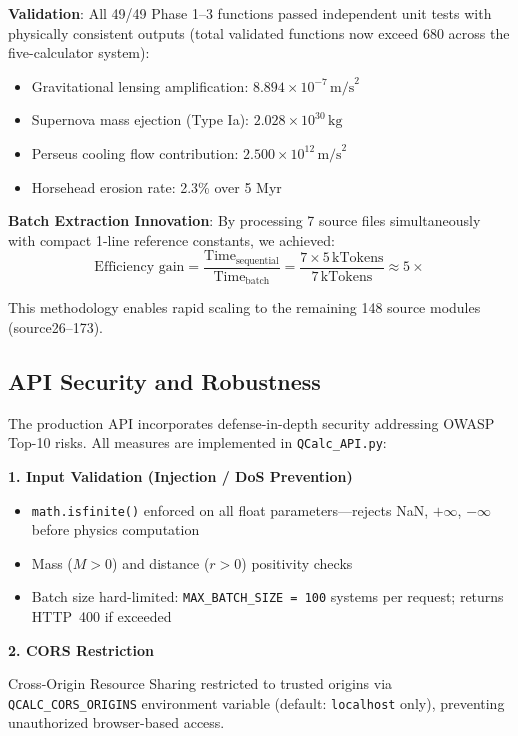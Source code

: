 \documentclass[12pt,a4paper]{article}
\begin{document}
\textbf{Validation}: All 49/49 Phase 1--3 functions passed independent unit tests with physically consistent outputs (total validated functions now exceed 680 across the five-calculator system):
\begin{itemize}
    \item Gravitational lensing amplification: $8.894 \times 10^{-7}\,\text{m/s}^2$
    \item Supernova mass ejection (Type Ia): $2.028 \times 10^{30}\,\text{kg}$
    \item Perseus cooling flow contribution: $2.500 \times 10^{12}\,\text{m/s}^2$
    \item Horsehead erosion rate: 2.3\% over 5 Myr
\end{itemize}

\textbf{Batch Extraction Innovation}: By processing 7 source files simultaneously with compact 1-line reference constants, we achieved:
\begin{equation}
\text{Efficiency gain} = \frac{\text{Time}_{\text{sequential}}}{\text{Time}_{\text{batch}}} = \frac{7 \times 5\,\text{kTokens}}{7\,\text{kTokens}} \approx 5\times
\end{equation}

This methodology enables rapid scaling to the remaining 148 source modules (source26--173).

\subsection{API Security and Robustness}

The production API incorporates defense-in-depth security addressing OWASP Top-10 risks. All measures are implemented in \texttt{QCalc\_API.py}:

\textbf{1. Input Validation (Injection / DoS Prevention)}
\begin{itemize}
    \item \texttt{math.isfinite()} enforced on all float parameters---rejects NaN, $+\infty$, $-\infty$ before physics computation
    \item Mass ($M > 0$) and distance ($r > 0$) positivity checks
    \item Batch size hard-limited: \texttt{MAX\_BATCH\_SIZE = 100} systems per request; returns HTTP~400 if exceeded
\end{itemize}

\textbf{2. CORS Restriction}

Cross-Origin Resource Sharing restricted to trusted origins via \texttt{QCALC\_CORS\_ORIGINS} environment variable (default: \texttt{localhost} only), preventing unauthorized browser-based access.
\end{document}
